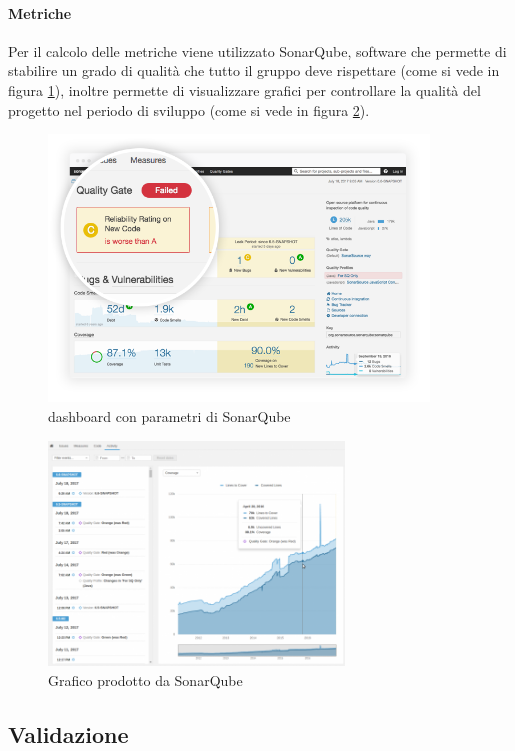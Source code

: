 \paragraph{Metriche} \Spazio
Per il calcolo delle metriche viene utilizzato SonarQube, software che permette di stabilire un grado di qualità che tutto il gruppo deve rispettare (come si vede in figura \ref{qualità}), inoltre permette di visualizzare grafici per controllare la qualità del progetto nel periodo di sviluppo (come si vede in figura \ref{graficobello}).
\begin{figure}[h]
	\centering
	\includegraphics[width=0.9\textwidth]{images/enforce-quality-gate.png}
	\caption{dashboard con parametri di SonarQube}
	\label{qualità}
\end{figure}
\begin{figure}[h]
	\centering
	\includegraphics[width=0.7\textwidth]{images/project-history2.png}
	\caption{Grafico prodotto da SonarQube}
	\label{graficobello}
\end{figure}

\subsection{Validazione}

